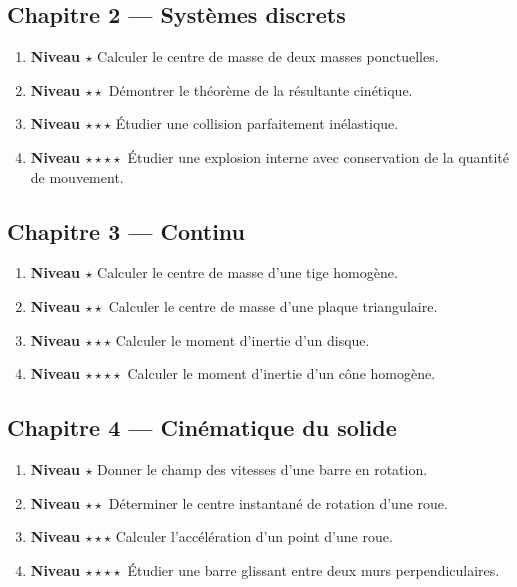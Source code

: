 \documentclass[11pt,a4paper]{article}
\newcommand{\niveau}[1]{\textbf{Niveau #1}}
\begin{document}
\subsection*{Chapitre 2 — Systèmes discrets}
\begin{enumerate}
  \item \niveau{$\star$} Calculer le centre de masse de deux masses ponctuelles.
  \item \niveau{$\star\star$} Démontrer le théorème de la résultante cinétique.
  \item \niveau{$\star\star\star$} Étudier une collision parfaitement inélastique.
  \item \niveau{$\star\star\star\star$} Étudier une explosion interne avec conservation de la quantité de mouvement.
\end{enumerate}

\subsection*{Chapitre 3 — Continu}
\begin{enumerate}
  \item \niveau{$\star$} Calculer le centre de masse d'une tige homogène.
  \item \niveau{$\star\star$} Calculer le centre de masse d'une plaque triangulaire.
  \item \niveau{$\star\star\star$} Calculer le moment d'inertie d'un disque.
  \item \niveau{$\star\star\star\star$} Calculer le moment d'inertie d'un cône homogène.
\end{enumerate}

\subsection*{Chapitre 4 — Cinématique du solide}
\begin{enumerate}
  \item \niveau{$\star$} Donner le champ des vitesses d'une barre en rotation.
  \item \niveau{$\star\star$} Déterminer le centre instantané de rotation d'une roue.
  \item \niveau{$\star\star\star$} Calculer l'accélération d'un point d'une roue.
  \item \niveau{$\star\star\star\star$} Étudier une barre glissant entre deux murs perpendiculaires.
\end{enumerate}
\end{document}
